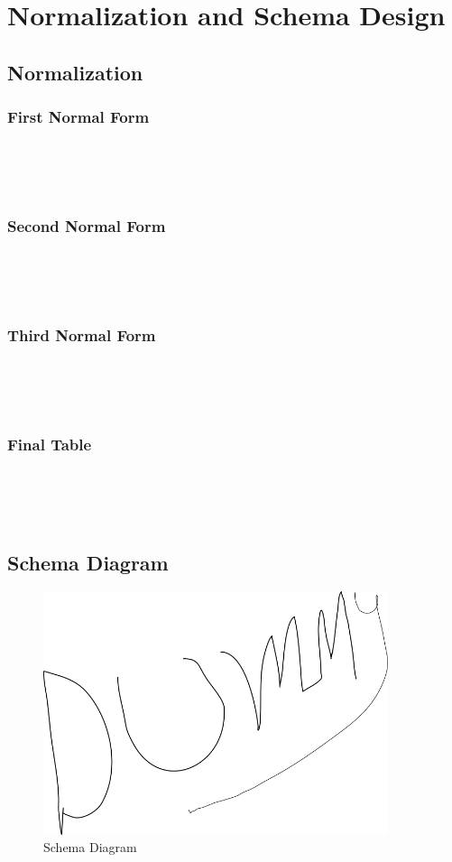 \chapter{Normalization and Schema Design}
\hrulefill

\section{Normalization}
\lipsum[1][1-3] 

\subsection{First Normal Form}
\lipsum[1][1] \\ [\baselineskip]
\lipsum[1][2] \\ [\baselineskip]
\lipsum[1][3] \\ [\baselineskip]

\subsection{Second Normal Form}
\lipsum[1][1] \\ [\baselineskip]
\lipsum[1][2] \\ [\baselineskip]
\lipsum[1][3] \\ [\baselineskip]

\subsection{Third Normal Form}
\lipsum[1][1] \\ [\baselineskip]
\lipsum[1][2] \\ [\baselineskip]
\lipsum[1][3] \\ [\baselineskip]

\subsection{Final Table}
\lipsum[1][1] \\ [\baselineskip]
\lipsum[1][2] \\ [\baselineskip]
\lipsum[1][3] \\ [\baselineskip]

\clearpage

\section{Schema Diagram}
\begin{figure}[h]
    \centering
    \includegraphics[width=0.9\textwidth]{images/dummy}
    \caption{Schema Diagram}
    \label{fig:Schema Diagram}
\end{figure}